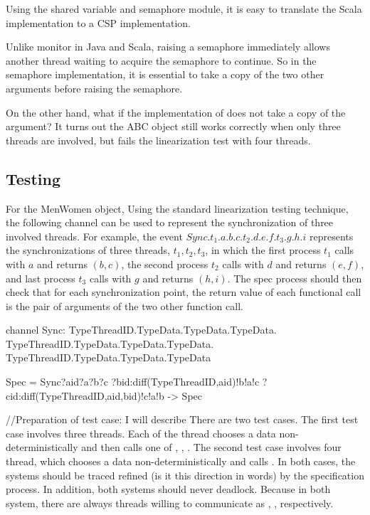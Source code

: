\documentclass{article}
\begin{document}
Using the shared variable and semaphore module, it is easy to translate the Scala implementation to a CSP implementation.

Unlike monitor in Java and Scala, raising a semaphore immediately allows another thread waiting to acquire the semaphore to continue. So in the semaphore implementation, it is essential to take a copy of the two other arguments before raising the semaphore.

On the other hand, what if the implementation of  does not take a copy of the argument? It turns out the ABC object still works correctly when only three threads are involved, but fails the linearization test with four threads.

\subsection{Testing}
For the MenWomen object, 
Using the standard linearization testing technique, the following  channel can be used to represent the synchronization of three involved threads. For example, the event $Sync.t_1.a.b.c.t_2.d.e.f.t_3.g.h.i$ represents the synchronizations of three threads, $t_1,t_2,t_3$, in which the first process $t_1$ calls  with $a$ and returns $(b,c)$, the second process $t_2$ calls  with $d$ and returns $(e,f)$, and last process $t_3$ calls  with $g$ and returns $(h,i)$. The spec process should then check that for each synchronization point, the return value of each functional call is the pair of arguments of the two other function call.

\begin{cspinline}{}{}
channel Sync: TypeThreadID.TypeData.TypeData.TypeData.
              TypeThreadID.TypeData.TypeData.TypeData.
              TypeThreadID.TypeData.TypeData.TypeData

Spec = Sync?aid?a?b?c
           ?bid:diff(TypeThreadID,{aid})!b!a!c
           ?cid:diff(TypeThreadID,{aid,bid})!c!a!b 
    -> Spec
\end{cspinline}
//Preparation of test case: I will describe 
There are two test cases. The first test case involves three threads. Each of the thread chooses a data non-deterministically and then calls one of , , . The second test case involves four thread, which chooses a data non-deterministically and calls . In both cases, the systems should be traced refined (is it this direction in words) by the specification process. In addition, both systems should never deadlock. Because in both system, there are always threads willing to communicate as , ,  respectively.
\end{document}
